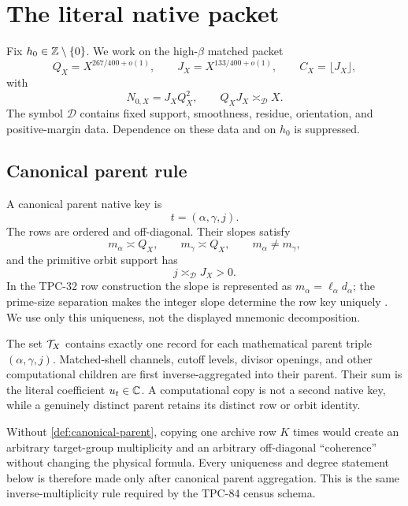 \section{The literal native packet}
\label{sec:literal-packet}

Fix \(h_0\in\mathbb Z\setminus\{0\}\).  We work on the high-\(\beta\)
matched packet
\begin{equation}
 Q_X=X^{267/400+o(1)},\qquad
 J_X=X^{133/400+o(1)},\qquad
 C_X=\lfloor J_X\rfloor,
\label{eq:critical-scales}
\end{equation}
with
\begin{equation}
 N_{0,X}=J_XQ_X^2,\qquad Q_XJ_X\asymp_{\mathscr D}X.
\label{eq:natural-scales}
\end{equation}
The symbol \(\mathscr D\) contains fixed support, smoothness,
residue, orientation, and positive-margin data.  Dependence on these
data and on \(h_0\) is suppressed.

\subsection{Canonical parent rule}

A canonical parent native key is
\[
 t=(\alpha,\gamma,j).
\]
The rows are ordered and off-diagonal.  Their slopes satisfy
\[
 m_\alpha\asymp Q_X,\qquad
 m_\gamma\asymp Q_X,\qquad
 m_\alpha\ne m_\gamma,
\]
and the primitive orbit support has
\[
 j\asymp_{\mathscr D}J_X>0.
\]
In the TPC-32 row construction the slope is represented as
\(m_\alpha=\ell_\alpha d_\alpha\); the prime-size separation makes
the integer slope determine the row key uniquely
\citep{WangTPC30,WangTPC31,WangTPC32}.  We use only this uniqueness,
not the displayed mnemonic decomposition.

\begin{definition}
\label{def:canonical-parent}
The set \(\mathcal T_X\) contains exactly one record for each mathematical
parent triple \((\alpha,\gamma,j)\).  Matched-shell channels, cutoff
levels, divisor openings, and other computational children are first
inverse-aggregated into their parent.  Their sum is the literal
coefficient \(u_t\in\mathbb C\).  A computational copy is not a second
native key, while a genuinely distinct parent retains its distinct
row or orbit identity.
\end{definition}

\begin{remark}
\label{rem:canonical-premise}
Without \cref{def:canonical-parent}, copying one archive row \(K\)
times would create an arbitrary target-group multiplicity and an
arbitrary off-diagonal ``coherence'' without changing the physical
formula.  Every uniqueness and degree statement below is therefore
made only after canonical parent aggregation.  This is the same
inverse-multiplicity rule required by the TPC-84 census schema.
\end{remark}

